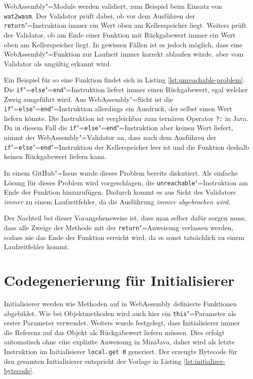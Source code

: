 WebAssembly"=Module werden validiert, zum Beispiel beim Einsatz von \lstinline{wat2wasm}. Der Validator prüft dabei, ob vor dem Ausführen der \lstinline{return}"=Instruktion immer ein Wert oben am Kellerspeicher liegt. Weiters prüft der Validator, ob am Ende einer Funktion mit Rückgabewert immer ein Wert oben am Kellerspeicher liegt. In gewissen Fällen ist es jedoch möglich, dass eine WebAssembly"=Funktion zur Laufzeit immer korrekt ablaufen würde, aber vom Validator als ungültig erkannt wird.

Ein Beispiel für so eine Funktion findet sich in Listing \ref{lst:unreachable-problem}. Die \lstinline{if}"=\lstinline{else}"=\lstinline{end}"=Instruktion liefert immer einen Rückgabewert, egal welcher Zweig ausgeführt wird. Aus WebAssembly"=Sicht ist die \lstinline{if}"=\lstinline{else}"=\lstinline{end}"=Instruktion allerdings ein Ausdruck, der selbst einen Wert liefern könnte. Die Instruktion ist vergleichbar zum ternären Operator \lstinline{?:} in Java. Da in diesem Fall die \lstinline{if}"=\lstinline{else}"=\lstinline{end}"=Instruktion aber keinen Wert liefert, nimmt der WebAssembly"=Validator an, dass nach dem Ausführen der \lstinline{if}"=\lstinline{else}"=\lstinline{end}"=Instruktion der Kellerspeicher leer ist und die Funktion deshalb keinen Rückgabewert liefern kann.



In einem GitHub"=Issue \cite{WebAssemblyUnreachableWorkaround} wurde dieses Problem bereits diskutiert. Als einfache Lösung für dieses Problem wird vorgeschlagen, die \lstinline{unreachable}"=Instruktion am Ende der Funktion hinzuzufügen. Dadurch kommt es aus Sicht des Validators \emph{immer} zu einem Laufzeitfehler, da die Ausführung \emph{immer abgebrochen wird}.

Der Nachteil bei dieser Vorangehensweise ist, dass man selber dafür sorgen muss, dass alle Zweige der Methode mit der \lstinline{return}"=Anweisung verlassen werden, sodass nie das Ende der Funktion erreicht wird, da es sonst tatsächlich zu einem Laufzeitfehler kommt.

\section{Codegenerierung für Initialisierer}

Initialisierer werden wie Methoden auf in WebAssembly definierte Funktionen abgebildet. Wie bei Objektmethoden wird auch hier ein \lstinline{this}"=Parameter als erster Parameter verwendet. Weiters wurde festgelegt, dass Initialisierer immer die Referenz auf das Objekt als Rückgabewert liefern müssen. Dies erfolgt automatisch ohne eine explizite Anweisung in MiniJava, daher wird als letzte Instruktion im Initialisierer \lstinline{local.get 0} generiert. Der erzeugte Bytecode für den gesamten Initialisierer entspricht der Vorlage in Listing \ref{lst:initializer-bytecode}.

